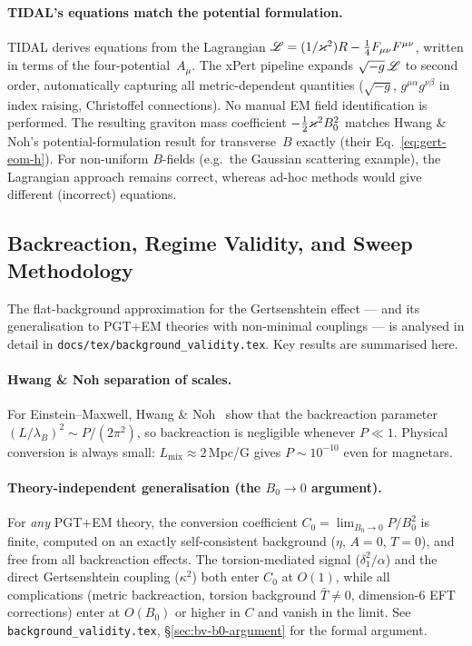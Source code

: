 \paragraph{TIDAL's equations match the potential formulation.}
TIDAL derives equations from the Lagrangian $\mathscr{L} = (1/\varkappa^2)R - \tfrac{1}{4}F_{\mu\nu}F^{\mu\nu}$,
written in terms of the four-potential~$A_\mu$.  The xPert pipeline expands
$\sqrt{-g}\,\mathscr{L}$ to second order, automatically capturing all metric-dependent
quantities ($\sqrt{-g}$, $g^{\mu\alpha}g^{\nu\beta}$ in index raising, Christoffel
connections).  No manual EM field identification is performed.  The resulting graviton
mass coefficient $-\tfrac{1}{2}\varkappa^2B_0^2$ matches Hwang \& Noh's potential-formulation
result for transverse~$B$ exactly (their Eq.~\eqref{eq:gert-eom-h}).  For non-uniform
$B$-fields (e.g.\ the Gaussian scattering example), the Lagrangian approach remains
correct, whereas ad-hoc methods would give different (incorrect) equations.

\subsection{Backreaction, Regime Validity, and Sweep Methodology}
\label{subsec:backreaction}

The flat-background approximation for the Gertsenshtein effect --- and its
generalisation to PGT+EM theories with non-minimal couplings --- is analysed in
detail in \texttt{docs/tex/background\_validity.tex}.  Key results are summarised
here.

\paragraph{Hwang \& Noh separation of scales.}
For Einstein--Maxwell, Hwang \& Noh~\cite{hwangnoh2023graviton} show that the
backreaction parameter $(L/\lambda_B)^2 \sim P/(2\pi^2)$, so backreaction is
negligible whenever $P \ll 1$.  Physical conversion is always small:
$L_\text{mix} \approx 2\,$Mpc/G gives $P \sim 10^{-10}$ even for magnetars.

\paragraph{Theory-independent generalisation (the $B_0 \to 0$ argument).}
For \emph{any} PGT+EM theory, the conversion coefficient
$C_0 = \lim_{B_0 \to 0} P/B_0^2$ is finite, computed on an exactly
self-consistent background ($\eta$, $A{=}0$, $T{=}0$), and free from all
backreaction effects.  The torsion-mediated signal ($\delta_1^2/\alpha$) and
the direct Gertsenshtein coupling ($\kappa^2$) both enter $C_0$ at $O(1)$,
while all complications (metric backreaction, torsion background $\bar{T} \neq 0$,
dimension-6 EFT corrections) enter at $O(B_0)$ or higher in $C$ and vanish in
the limit.  See \texttt{background\_validity.tex},
\S\ref{sec:bv-b0-argument} for the formal argument.

